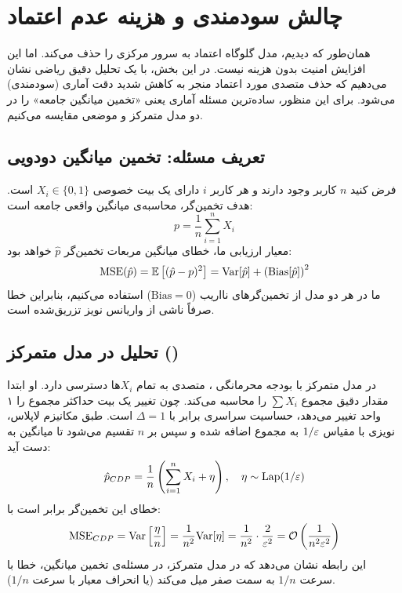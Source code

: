 \section{چالش سودمندی و هزینه عدم اعتماد}
\label{sec:ldp:utility-challenge}

همان‌طور که دیدیم، مدل  گلوگاه اعتماد به سرور مرکزی را حذف می‌کند. اما این افزایش امنیت بدون هزینه نیست. در این بخش، با یک تحلیل دقیق ریاضی نشان می‌دهیم که حذف متصدی مورد اعتماد منجر به کاهش شدید دقت آماری (سودمندی) می‌شود. برای این منظور، ساده‌ترین مسئله آماری یعنی «تخمین میانگین جامعه» را در دو مدل متمرکز و موضعی مقایسه می‌کنیم.

\subsection{تعریف مسئله: تخمین میانگین دودویی}
فرض کنید $n$ کاربر وجود دارند و هر کاربر $i$ دارای یک بیت خصوصی $X_i \in \{0, 1\}$ است. هدف تخمین‌گر، محاسبه‌ی میانگین واقعی جامعه است:
\begin{equation}
p = \frac{1}{n} \sum_{i=1}^n X_i
\end{equation}
معیار ارزیابی ما، خطای میانگین مربعات تخمین‌گر $\hat{p}$ خواهد بود:
\begin{equation}
\mathrm{MSE}(\hat{p}) = \Eset\left[ (\hat{p} - p)^2 \right] = \mathrm{Var}[\hat{p}] + \left(\mathrm{Bias}[\hat{p}]\right)^2
\end{equation}
ما در هر دو مدل از تخمین‌گرهای نااریب ($\mathrm{Bias}  = 0$) استفاده می‌کنیم، بنابراین خطا صرفاً ناشی از واریانس نویز تزریق‌شده است.

\subsection{تحلیل در مدل متمرکز ()}
در مدل متمرکز با بودجه محرمانگی \DP[\eps]، متصدی به تمام $X_i$ها دسترسی دارد. او ابتدا مقدار دقیق مجموع $\sum X_i$ را محاسبه می‌کند. چون تغییر یک بیت حداکثر مجموع را ۱ واحد تغییر می‌دهد، حساسیت سراسری برابر با $\Delta = 1$ است.
طبق مکانیزم لاپلاس، نویزی با مقیاس $1/\varepsilon$ به مجموع اضافه شده و سپس بر $n$ تقسیم می‌شود تا میانگین به دست آید:
\begin{equation}
\hat{p}_{CDP} = \frac{1}{n} \left( \sum_{i=1}^n X_i + \eta \right), \quad \eta \sim \mathrm{Lap}(1/\varepsilon)
\end{equation}
خطای این تخمین‌گر برابر است با:
\begin{equation}
\label{eq:cdp-error}
\mathrm{MSE}_{CDP} = \mathrm{Var}\left[ \frac{\eta}{n} \right] = \frac{1}{n^2} \mathrm{Var}[\eta] = \frac{1}{n^2} \cdot \frac{2}{\varepsilon^2} = \mathcal{O}\left( \frac{1}{n^2 \varepsilon^2} \right)
\end{equation}
این رابطه نشان می‌دهد که در مدل متمرکز، در مسئله‌ی تخمین میانگین، خطا با سرعت $1/n$ به سمت صفر میل می‌کند (یا انحراف معیار با سرعت $1/n$).

